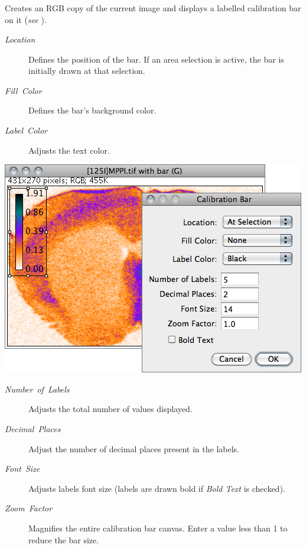 

\subsubsection{\protect{}\label{sub:Calibration-Bar...}}

Creates
an RGB copy of the current image and displays a labelled calibration
bar on it (\emph{see} ).
\begin{description}
\item [{\emph{Location}}] Defines the position of the bar. If an area selection
is active, the bar is initially drawn at that selection.
\item [{\emph{Fill\ Color}}] Defines the bar's background color.
\item [{\emph{Label\ Color}}] Adjusts the text color.
\end{description}
\begin{minipage}[c][1\totalheight][t]{0.67\columnwidth}%
\noindent \includegraphics[scale=0.55]{images/CalibrationBar}%
\end{minipage}%
\begin{minipage}[c][1\totalheight][t]{0.33\columnwidth}%
\begin{description}
\item [{\emph{Number}\ \emph{of}\ \emph{Labels}}] Adjusts the total number
of values displayed. 
\item [{\emph{Decimal\ Places}}] Adjust the number of decimal places present
in the labels.
\item [{\emph{Font\ Size}}] Adjusts labels font size (labels are drawn
bold if \emph{Bold Text} is checked).
\item [{\emph{Zoom\ Factor}}] Magnifies the entire calibration bar canvas.
Enter a value less than 1 to reduce the bar size.\end{description}
%
\end{minipage}

